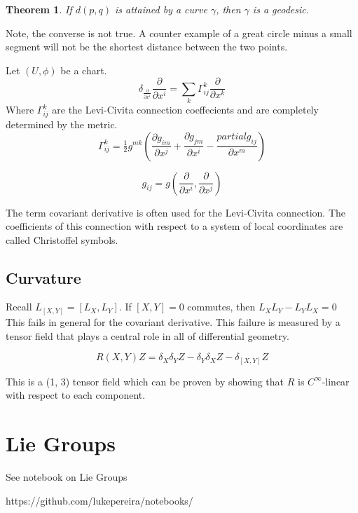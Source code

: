 \documentclass{article}
\newtheorem{theorem}{Theorem}[section]
\theoremstyle{definition}
\begin{document}
\begin{theorem}

If $d(p,q)$ is attained by a curve $\gamma$, then $\gamma$ is a geodesic.

\end{theorem}

Note, the converse is not true. A counter example of a great circle minus a small segment will not be the shortest distance between the two points.

Let $(U, \phi)$ be a chart.
\[
    \delta_{\frac{\partial}{\partial x^i}} \frac{\partial }{\partial x^i}  = \sum_k \Gamma_{ij}^k \frac{\partial}{\partial x^k}
\]
Where $ \Gamma_{ij}^k$ are the Levi-Civita connection coeffecients and are completely determined by the metric.
\[
 \Gamma _{ij}^{k}={\tfrac {1}{2}}g^{mk}\left(
 \frac{\partial g_{im}}{\partial x^j}
 + \frac{ \partial g_{jm}}{\partial x^i}
 -\frac{partial g_{ij}}{\partial x ^m}\right)
\]

\[
    g_{ij} = g(\frac{\partial}{\partial x^i}, \frac{\partial}{\partial x^j})
\]

The term covariant derivative is often used for the Levi-Civita connection. The coefficients of this connection with respect to a system of local coordinates are called Christoffel symbols.

\subsection{Curvature}

Recall $L_[X,Y] = [L_X, L_Y]$. If $[X,Y]=0$ commutes, then $L_X L_Y - L_Y L_X = 0$ This fails in general for the covariant derivative. This failure is measured by a tensor field that plays a central role in all of differential geometry.

\[
    R(X,Y) Z = \delta_X \delta_Y Z - \delta_Y \delta_X Z - \delta_[X,Y] Z
\]

This is a (1, 3) tensor field which can be proven by showing that $R$ is $C^\infty$-linear with respect to each component.   

\section{Lie Groups}
See notebook on Lie Groups

\begin{url}
https://github.com/lukepereira/notebooks/
\end{url}

\end{document}
